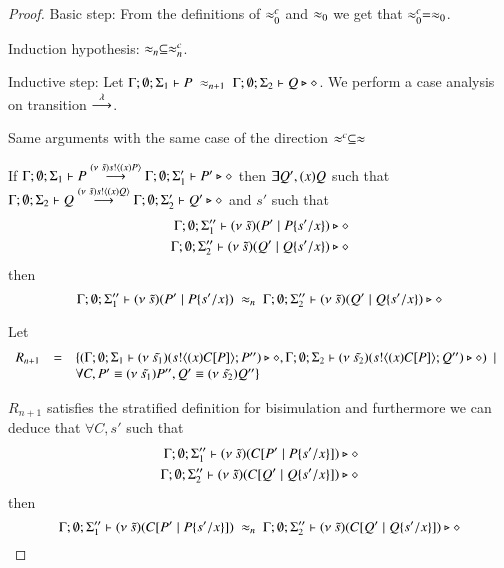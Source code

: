 \begin{proof}
	Basic step: From the definitions of $\approx^{c}_0$ and $\approx_0$ we get that $\approx^{c}_0 = \approx_0$.

	Induction hypothesis: $\approx_n \subseteq \approx^{c}_n$.

	Inductive step: Let $\Gamma; \emptyset; \Sigma_1 \vdash P\ \approx_{n+1}\ \Gamma; \emptyset; \Sigma_2 \vdash Q \triangleright \diamond$.
	We perform a case analysis on transition $\stackrel{\lambda}{\longrightarrow}$.

	Same arguments with the same case of the direction $\approx^{c} \subseteq \approx$


	If $\Gamma; \emptyset; \Sigma_1 \vdash P \stackrel{(\nu\ \tilde{s}) s ! \langle (x)P \rangle}{\longrightarrow} \Gamma; \emptyset; \Sigma_1' \vdash P' \triangleright \diamond$ then
	$\exists Q', (x)Q$ such that
	$\Gamma; \emptyset; \Sigma_2 \vdash Q \stackrel{(\nu\ \tilde{s}) s ! \langle (x)Q \rangle}{\longrightarrow} \Gamma; \emptyset; \Sigma_2' \vdash Q' \triangleright \diamond$
	and $s'$
	such that
	\begin{eqnarray*}
		\Gamma; \emptyset; \Sigma_1'' \vdash (\nu\ \tilde{s})(P' \;|\; P \{s'/x \}) \triangleright \diamond \\
		\Gamma; \emptyset; \Sigma_2'' \vdash (\nu\ \tilde{s})(Q' \;|\; Q \{s'/x \}) \triangleright \diamond
	\end{eqnarray*}
	then
	\[
		\Gamma; \emptyset; \Sigma_1'' \proves \newsp{\tilde{s}}{P' \Par P \subst{s'}{x}}\ \wb_{n}\ 
		\Gamma; \emptyset; \Sigma_2'' \proves \newsp{\tilde{s}}{Q' \Par Q \subst{s'}{x}} \hastype \Proc
	\]

	Let
	\[
		\begin{array}{rcl}
			R_{n + 1} &=& \{	(\Gamma; \emptyset; \Sigma_1 \vdash (\nu\ \tilde{s_1})(s ! \langle (x)C[P] \rangle ; P'') \triangleright \diamond,
						\Gamma; \emptyset; \Sigma_2 \vdash (\nu\ \tilde{s_2})(s ! \langle (x)C[P] \rangle ; Q'') \triangleright \diamond) \ \ |\ \ \\
				& &		\forall C, P' \equiv (\nu\ \tilde{s_1}) P'', Q' \equiv (\nu\ \tilde{s_2}) Q''\}
		\end{array}
	\]


	$R_{n+1}$ satisfies the stratified definition for bisimulation and furthermore we can deduce that
	$\forall C, s'$
	such that
	\begin{eqnarray*}
		\Gamma; \emptyset; \Sigma_1'' \vdash (\nu\ \tilde{s})(C[P' \;|\; P \{s'/x \}]) \triangleright \diamond \\
		\Gamma; \emptyset; \Sigma_2'' \vdash (\nu\ \tilde{s})(C[Q' \;|\; Q \{s'/x \}]) \triangleright \diamond
	\end{eqnarray*}
	then
	\[
		\Gamma; \emptyset; \Sigma_1'' \proves \newsp{\tilde{s}}{\context{C}{P' \Par P \subst{s'}{x}}}\ \wb_{n}\ 
		\Gamma; \emptyset; \Sigma_2'' \proves \newsp{\tilde{s}}{\context{C}{Q' \Par Q \subst{s'}{x}}} \hastype \Proc
	\]


\end{proof}
